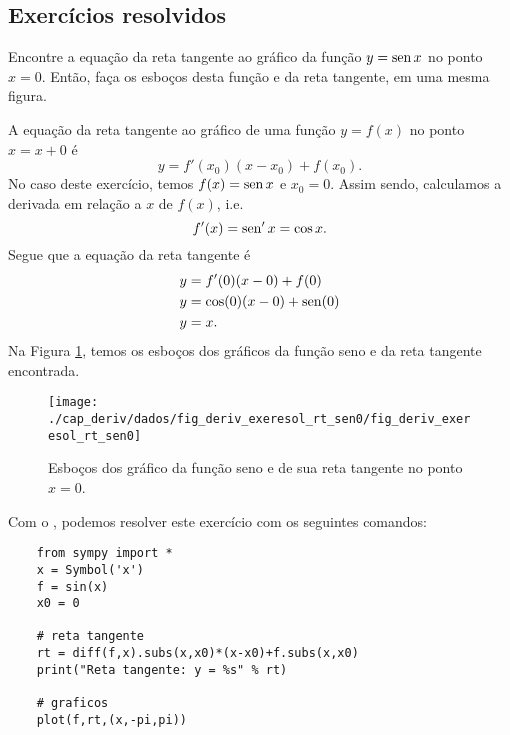 \subsection{Exercícios resolvidos}

\begin{exeresol}
  Encontre a equação da reta tangente ao gráfico da função $y = \operatorname{sen} x$ no ponto $x=0$. Então, faça os esboços desta função e da reta tangente, em uma mesma figura.
\end{exeresol}
\begin{resol}
  A equação da reta tangente ao gráfico de uma função $y = f(x)$ no ponto $x=x+0$ é
  \begin{equation}
    y = f'(x_0)(x-x_0)+f(x_0).
  \end{equation}
  No caso deste exercício, temos $f(x)=\operatorname{sen} x$ e $x_0=0$. Assim sendo, calculamos a derivada em relação a $x$ de $f(x)$, i.e.
  \begin{equation}
    f'(x) = \operatorname{sen}' x = \cos x.
  \end{equation}
  Segue que a equação da reta tangente é
  \begin{align}
    & y = f'(0)(x-0)+f(0) \\
    & y = \cos(0)(x-0)+\operatorname{sen}(0) \\
    & y = x.
  \end{align}
  Na Figura \ref{fig:deriv_exeresol_rt_sen0}, temos os esboços dos gráficos da função seno e da reta tangente encontrada.

  \begin{figure}[H]
    \centering
    \texttt{[image: ./cap\_deriv/dados/fig\_deriv\_exeresol\_rt\_sen0/fig\_deriv\_exeresol\_rt\_sen0]}
    \caption{Esboços dos gráfico da função seno e de sua reta tangente no ponto $x=0$.}
    \label{fig:deriv_exeresol_rt_sen0}
  \end{figure}

  \ifispython
  Com o \sympy, podemos resolver este exercício com os seguintes comandos:
  \begin{lstlisting}
    from sympy import *
    x = Symbol('x')
    f = sin(x)
    x0 = 0

    # reta tangente
    rt = diff(f,x).subs(x,x0)*(x-x0)+f.subs(x,x0)
    print("Reta tangente: y = %s" % rt)

    # graficos
    plot(f,rt,(x,-pi,pi))
  \end{lstlisting}
  \fi  
\end{resol}

